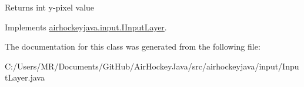 \begin{DoxyReturn}{Returns}
int y-\/pixel value 
\end{DoxyReturn}


Implements \hyperlink{interfaceairhockeyjava_1_1input_1_1_i_input_layer_a0449dbad5fcef8e2660b4cacdcff14fa}{airhockeyjava.\+input.\+I\+Input\+Layer}.



The documentation for this class was generated from the following file\+:\begin{DoxyCompactItemize}
\item 
C\+:/\+Users/\+M\+R/\+Documents/\+Git\+Hub/\+Air\+Hockey\+Java/src/airhockeyjava/input/Input\+Layer.\+java\end{DoxyCompactItemize}
